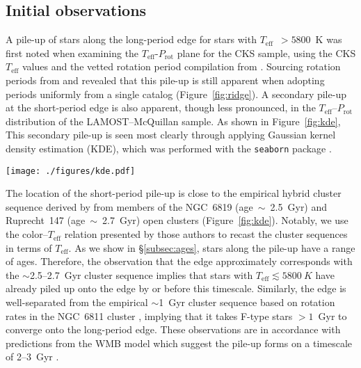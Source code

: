 \documentclass[linenumbers,tighten,trackchanges,twocolumn]{aastex631}
\newcommand{\lamostmcq}{LAMOST--McQuillan\xspace}
\newcommand{\teff}{\ensuremath{T_{\mathrm{eff}}}\xspace}
\newcommand{\prot}{\ensuremath{P_\mathrm{rot}}\xspace}
\begin{document}
\subsection{Initial observations}
A pile-up of stars along the long-period edge for stars with \teff~$>5800$~K was first noted when examining the \teff-\prot plane for the CKS sample, using the CKS \teff values and the vetted rotation period compilation from \citet{David2021}. Sourcing rotation periods from \citet{McQuillan2013, Mazeh2015} and \citet{Angus2018} revealed that this pile-up is still apparent when adopting periods uniformly from a single catalog (Figure~\ref{fig:ridge}). A secondary pile-up at the short-period edge is also apparent, though less pronounced, in the \teff--\prot distribution of the \lamostmcq sample. As shown in Figure~\ref{fig:kde}, This secondary pile-up is seen most clearly through applying Gaussian kernel density estimation (KDE), which was performed with the \texttt{seaborn} package \citep{seaborn}.

\begin{figure*}
    \centering
    \texttt{[image: ./figures/kde.pdf]}
    \caption{Gaussian kernel density estimation (blue contours) of the \teff--\prot distributions of the CKS--McQuillan, \lamostmcq, and asteroseismic \citet{Hall2021} samples, from left to right. Empirical cluster sequences from \citet{Curtis2020} are shown by the dark grey lines. The orange dashed lines show constant Rossby curves of fiducial values (see \S\ref{subsec:rossby}). The short-period pile-up can be observed in the LAMOST--McQuillan sample for \teff~$\gtrsim$~5500~K. The orange point indicates the Sun's temperature and equatorial rotation period, with the errorbar capturing the range of periods measured from its differentially rotating surface.}
    \label{fig:kde}
\end{figure*}

The location of the short-period pile-up is close to the empirical hybrid cluster sequence derived by \citet{Curtis2020} from members of the NGC~6819 (age~$\sim$~2.5~Gyr) and Ruprecht~147 (age~$\sim$~2.7~Gyr) open clusters (Figure~\ref{fig:kde}). Notably, we use the color--\teff relation presented by those authors to recast the cluster sequences in terms of \teff. As we show in \S\ref{subsec:ages}, stars along the pile-up have a range of ages. Therefore, the observation that the edge approximately corresponds with the $\sim$2.5--2.7~Gyr cluster sequence implies that stars with \teff$\lesssim 5800~K$ have already piled up onto the edge by or before this timescale. Similarly, the edge is well-separated from the empirical $\sim$1~Gyr cluster sequence based on rotation rates in the NGC~6811 cluster \citep{Curtis2020}, implying that it takes F-type stars $>1$~Gyr to converge onto the long-period edge. These observations are in accordance with predictions from the WMB model which suggest the pile-up forms on a timescale of 2--3~Gyr \citep{vanSaders2019}.
\end{document}
